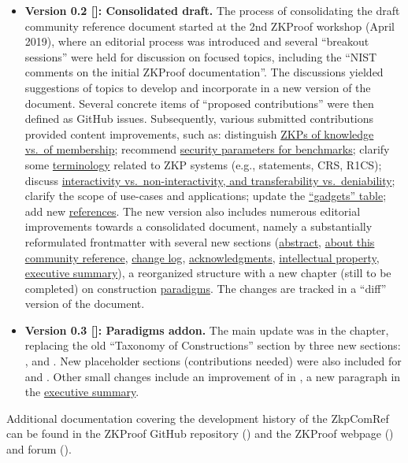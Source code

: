 \begin{itemize}
\item \textbf{Version 0.2 [\dateVersionZeroDotTwo]: Consolidated draft.}
The process of consolidating the draft community reference document started at the 2nd ZKProof workshop (April 2019), where an editorial process was introduced and several ``breakout sessions'' were held for discussion on focused topics, including the ``NIST comments on the initial ZKProof documentation''.
The discussions yielded suggestions of topics to develop and incorporate in a new version of the document.
Several concrete items of ``proposed contributions'' were then defined as GitHub issues.
Subsequently, various submitted contributions provided content improvements, such as:
	distinguish \hyperref[security:zkp-knowledge-vs-membership]{ZKPs of knowledge vs.\ of membership};
	recommend \hyperref[security:Efficiency]{security parameters for benchmarks};
	clarify some \hyperref[security:terminology]{terminology} related to ZKP systems (e.g., statements, CRS, R1CS);
	discuss \hyperref[paradigms:interactivity]{interactivity vs.\ non-interactivity, and transferability vs.\ deniability};
	clarify the scope of use-cases and applications; 
	update the \hyperref[tab:list-gadgets]{``gadgets'' table}; add new \hyperref[references]{references}.
The new version also includes numerous editorial improvements towards a consolidated document, namely a substantially reformulated frontmatter with several new sections (\hyperref[sec:prelim:abstract]{abstract}, \hyperref[sec:prelim:about-this-version]{about this community reference}, \hyperref[app:version-history]{change log}, \hyperref[app:acknowledgments]{acknowledgments}, \hyperref[sec:prelim:IP]{intellectual property}, \hyperref[sec:prelim:executive-summary]{executive summary}), a reorganized structure with a new chapter (still to be completed) on construction \hyperref[chap:paradigms]{paradigms}.
The changes are tracked in a ``diff'' version of the document.


\item \textbf{Version 0.3 [\dateVersionZeroDotThree]: Paradigms addon.}
The main update was in the  chapter, replacing the old ``Taxonomy of Constructions'' section by three new sections: ,  and .
New placeholder sections (contributions needed) were also included for  and .
Other small changes include an improvement of  in , a new paragraph in the \hyperref[]{executive summary}.

\end{itemize}


Additional documentation covering the development history of the ZkpComRef can be found in the 
ZKProof GitHub repository ()
and the ZKProof webpage (\sloppy\mbox{})
and forum ().
\loosen
